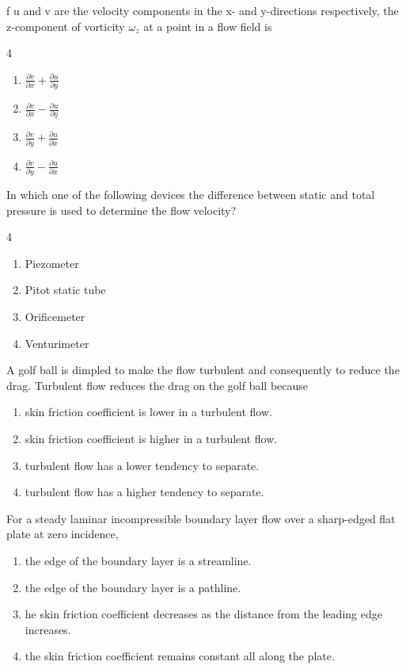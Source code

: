 \item f u and v are the velocity components in the x- and y-directions respectively, the z-component of vorticity $\omega_{z}$ at a point in a flow field is

\begin{multicols} {4}
    \begin{enumerate}
        \item $\frac{\partial v}{\partial x}+\frac{\partial u}{\partial y}$
        \item $\frac{\partial v}{\partial x}-\frac{\partial u}{\partial y}$
        \item $\frac{\partial v}{\partial y}+\frac{\partial u}{\partial x}$
        \item$\frac{\partial v}{\partial y}-\frac{\partial u}{\partial x}$
    \end{enumerate}
\end{multicols}
\bigskip 

\item In which one of the following devices the difference between static and total pressure is used to determine the flow velocity?

\begin{multicols} {4}
    \begin{enumerate}
     \item Piezometer
     \item Pitot static tube
    \item Orificemeter
    \item Venturimeter
    \end{enumerate}
\end{multicols}
\bigskip 

\item A golf ball is dimpled to make the flow turbulent and consequently to reduce the drag. Turbulent flow reduces the drag on the golf ball because

\begin{enumerate}
    \item skin friction coefficient is lower in a turbulent flow.
    \item skin friction coefficient is higher in a turbulent flow.
    \item turbulent flow has a lower tendency to separate.
    \item turbulent flow has a higher tendency to separate.
\end{enumerate}
\bigskip

\item For a steady laminar incompressible boundary layer flow over a sharp-edged flat plate at zero incidence,

\begin{enumerate}
     \item the edge of the boundary layer is a streamline.
    \item the edge of the boundary layer is a pathline.
    \item he skin friction coefficient decreases as the distance from the leading edge increases.
     \item the skin friction coefficient remains constant all along the plate.
\end{enumerate}

